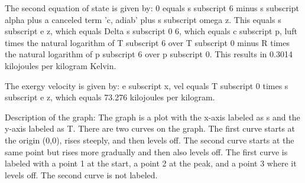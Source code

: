 The second equation of state is given by:
0 equals s subscript 6 minus s subscript alpha plus a canceled term 'c, adiab' plus s subscript omega z. This equals s subscript e z, which equals Delta s subscript 0 6, which equals c subscript p, luft times the natural logarithm of T subscript 6 over T subscript 0 minus R times the natural logarithm of p subscript 6 over p subscript 0. This results in 0.3014 kilojoules per kilogram Kelvin.

The exergy velocity is given by:
e subscript x, vel equals T subscript 0 times s subscript e z, which equals 73.276 kilojoules per kilogram.

Description of the graph:
The graph is a plot with the x-axis labeled as s and the y-axis labeled as T. There are two curves on the graph. The first curve starts at the origin (0,0), rises steeply, and then levels off. The second curve starts at the same point but rises more gradually and then also levels off. The first curve is labeled with a point 1 at the start, a point 2 at the peak, and a point 3 where it levels off. The second curve is not labeled.
